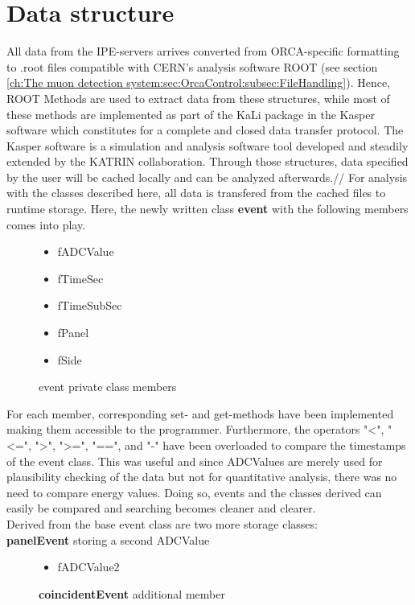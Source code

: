   \section{Data structure}
  \label{ch:Analysis software:sec:Data structure}
    All data from the IPE-servers arrives converted from ORCA-specific formatting to .root files compatible with CERN's analysis software ROOT (see section \ref{ch:The muon detection system:sec:OrcaControl:subsec:FileHandling}). Hence, ROOT Methods are used to extract data from these structures, while most of these methods are implemented as part of the KaLi package in the Kasper software which constitutes for a complete and closed data transfer protocol. The Kasper software is a simulation and analysis software tool developed and steadily extended by the KATRIN collaboration.
    Through those structures, data specified by the user will be cached locally and can be analyzed afterwards.//
    For analysis with the classes described here, all data is transfered from the cached files to runtime storage.
    Here, the newly written class {\bf event} with the following members comes into play.
    \begin{figure}[H]
      \caption*{event private class members}
      \begin{itemize}
	\item fADCValue
	\item fTimeSec
    	\item fTimeSubSec
    	\item fPanel
    	\item fSide
      \end{itemize}
    \end{figure}
    For each member, corresponding set- and get-methods have been implemented making them accessible to the programmer. Furthermore, the operators "<", "<=", ">", ">=", "==", and "-" have been overloaded to compare the timestamps of the event class. This was useful and since ADCValues are merely used for plausibility checking of the data but not for quantitative analysis, there was no need to compare energy values. Doing so, events and the classes derived can easily be compared and searching becomes cleaner and clearer.\\
    Derived from the base event class are two more storage classes:\\
    {\bf panelEvent} storing a second ADCValue
    \begin{figure}[H]
      \caption*{{\bf coincidentEvent} additional member}
      \begin{itemize}
	\item fADCValue2
      \end{itemize}
    \end{figure}
	
